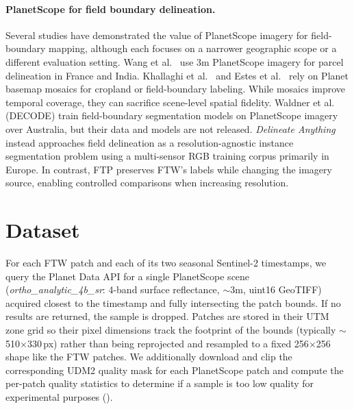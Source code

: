 \documentclass[10pt,twocolumn,letterpaper]{article}
\begin{document}
\paragraph{PlanetScope for field boundary delineation.}
Several studies have demonstrated the value of PlanetScope imagery for field-boundary mapping, although each focuses on a narrower geographic scope or a different evaluation setting. Wang et al.~\cite{wang2022unlocking} use 3m PlanetScope imagery for parcel delineation in France and India. Khallaghi et al.~\cite{khallaghi2025generalization} and Estes et al.~\cite{estes2024africa} rely on Planet basemap mosaics for cropland or field-boundary labeling. While mosaics improve temporal coverage, they can sacrifice scene-level spatial fidelity. Waldner et al.~\cite{waldner2021decode} (DECODE) train field-boundary segmentation models on PlanetScope imagery over Australia, but their data and models are not released. \emph{Delineate Anything}~\cite{lavreniuk2025delineate} instead approaches field delineation as a resolution-agnostic instance segmentation problem using a multi-sensor RGB training corpus primarily in Europe. In contrast, FTP preserves FTW's labels while changing the imagery source, enabling controlled comparisons when increasing resolution.

\begin{table}[t]
    \centering
    \caption{\textbf{Polygon-level results macro-averaged over the 10 dense held-out countries dominated by smallholder fields}. With matched backbones, FTP (PlanetScope) improves all polygon-level field-boundary metrics (PQ, SQ, RQ, F1, and boundary error) over Sentinel-2. Boundary error is computed on matched polygons only, while missed or hallucinated fields affect RQ/F1. $^{\dagger}$Pixel IoU is not comparable across sensors due to differences in resolution.}
    \label{tab:polygon_metrics}
    
\end{table}

\section{Dataset}
\label{sec:dataset}
For each FTW patch and each of its two seasonal Sentinel-2 timestamps, we query the Planet Data API for a single PlanetScope scene (\textit{ortho\_analytic\_4b\_sr}: 4-band surface reflectance, $\sim$3m, uint16 GeoTIFF) acquired closest to the timestamp and fully intersecting the patch bounds. If no results are returned, the sample is dropped. Patches are stored in their UTM zone grid so their pixel
dimensions track the footprint of the bounds (typically $\sim$510$\times$330\,px) rather than being reprojected and resampled to a fixed 256$\times$256 shape like the FTW patches. We additionally download and clip the corresponding UDM2 quality mask for each PlanetScope patch and compute the per-patch quality statistics to determine if a sample is too low quality for experimental purposes ().
\end{document}
